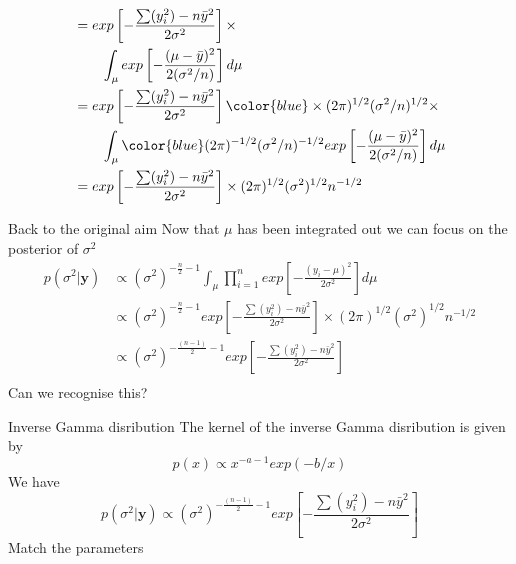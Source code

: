 \documentclass[10pt]{beamer}
\begin{document}
\begin{frame}
  \begin{align*}
    &=exp\left[-\frac{\sum(y_i^2)-n\bar{y}^2}{2\sigma^2}\right]\times\\
    &\quad\quad
      \int_{\mu}exp\left[-\frac{(\mu-\bar{y})^2}{2(\sigma^2/n)}\right]
      d\mu\\
    &=exp\left[-\frac{\sum(y_i^2)-n\bar{y}^2}{2\sigma^2}\right]{\color{blue} \times(2\pi)^{1/2}(\sigma^2/n)^{1/2}}\times\\
    &\quad\quad
      \int_{\mu}{\color{blue}(2\pi)^{-1/2}(\sigma^2/n)^{-1/2}}exp\left[-\frac{(\mu-\bar{y})^2}{2(\sigma^2/n)}\right]
      d\mu\\
    &=exp\left[-\frac{\sum(y_i^2)-n\bar{y}^2}{2\sigma^2}\right]\times(2\pi)^{1/2}(\sigma^2)^{1/2}n^{-1/2}\\
  \end{align*}
\end{frame}
\begin{frame}{Back to the original aim}
  Now that $\mu$ has been integrated out we can focus on the posterior of $\sigma^2$
  \begin{align*}
    p(\sigma^2|{\bm y})&\propto (\sigma^2)^{-\frac{n}{2}-1}\int_{\mu}\prod_{i=1}^n
                         exp\left[-\frac{(y_i-\mu)^2}{2\sigma^2}\right]d\mu\\
                       &\propto (\sigma^2)^{-\frac{n}{2}-1}exp\left[-\frac{\sum(y_i^2)-n\bar{y}^2}{2\sigma^2}\right]\times(2\pi)^{1/2}(\sigma^2)^{1/2}n^{-1/2}\\
                       &\propto (\sigma^2)^{-\frac{(n-1)}{2}-1}exp\left[-\frac{\sum(y_i^2)-n\bar{y}^2}{2\sigma^2}\right]\\
  \end{align*}
  Can we recognise this?
\end{frame}
\begin{frame}{Inverse Gamma disribution}
  The kernel of the inverse Gamma disribution is given by
  \begin{equation}
    p(x)\propto x^{-a-1}exp(-b/x)
  \end{equation}
  We have
  \begin{equation}
    p(\sigma^2|{\bm y})\propto (\sigma^2)^{-\frac{(n-1)}{2}-1}exp\left[-\frac{\sum(y_i^2)-n\bar{y}^2}{2\sigma^2}\right]
  \end{equation}
  Match the parameters
\end{frame}
\end{document}
